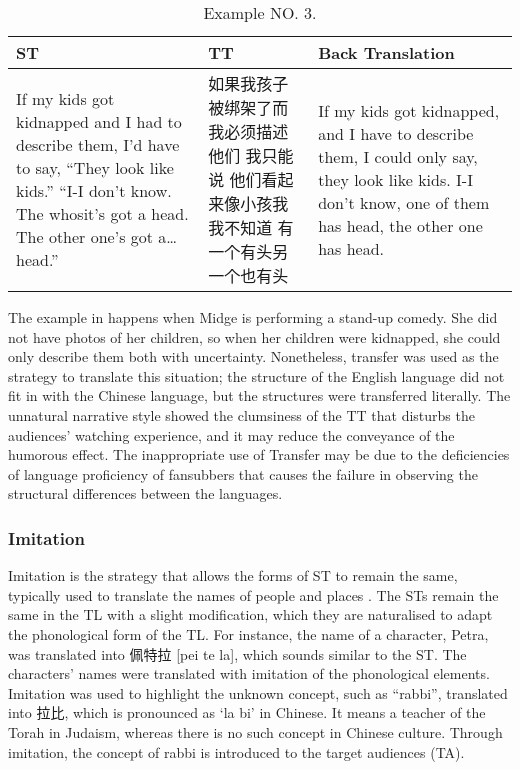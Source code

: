 \documentclass[english]{textolivre}
\begin{document}
\begin{table}[htpb]
\caption{Example NO. 3.}
\label{tbl03}
\begin{tabularx}{\linewidth}{XXX}
\toprule 
ST  & TT & Back Translation \\ 
\midrule
If my kids got kidnapped and I had to describe them, I'd have to say, “They look like kids.” “I-I don't know. The whosit's got a head. The other one's got a… head.” & 如果我孩子被绑架了而我必须描述他们 我只能说 他们看起来像小孩我 我不知道 有一个有头另一个也有头  & If my kids got kidnapped, and I have to describe them, I could only say, they look like kids.
I-I don't know, one of them has head, the other one has head. \\ 
\bottomrule
\end{tabularx}
\end{table}

The example in  happens when Midge is performing a stand-up comedy. She did not have photos of her children, so when her children were kidnapped, she could only describe them both with uncertainty. Nonetheless, transfer was used as the strategy to translate this situation; the structure of the English language did not fit in with the Chinese language, but the structures were transferred literally. The unnatural narrative style showed the clumsiness of the TT that disturbs the audiences' watching experience, and it may reduce the conveyance of the humorous effect. The inappropriate use of Transfer may be due to the deficiencies of language proficiency of fansubbers that causes the failure in observing the structural differences between the languages. 

\subsubsection{Imitation}
Imitation is the strategy that allows the forms of ST to remain the same, typically used to translate the names of people and places \cite{gottlieb_1992}. The STs remain the same in the TL with a slight modification, which they are naturalised to adapt the phonological form of the TL. For instance, the name of a character, Petra, was translated into 佩特拉 [pei te la], which sounds similar to the ST. The characters' names were translated with imitation of the phonological elements. Imitation was used to highlight the unknown concept, such as “rabbi”, translated into 拉比, which is pronounced as `la bi' in Chinese. It means a teacher of the Torah in Judaism, whereas there is no such concept in Chinese culture. Through imitation, the concept of rabbi is introduced to the target audiences (TA). 
\end{document}

